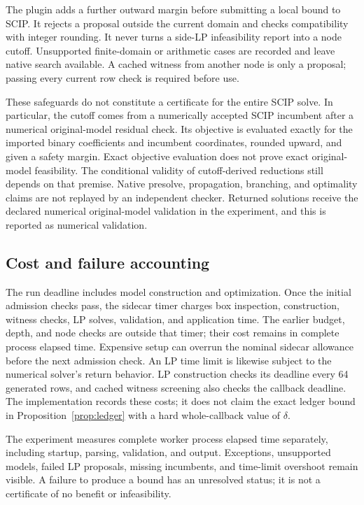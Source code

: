 The plugin adds a further outward margin before submitting a local bound
to SCIP. It rejects a proposal outside the current domain and checks
compatibility with integer rounding. It never turns a side-LP
infeasibility report into a node cutoff. Unsupported finite-domain or
arithmetic cases are recorded and leave native search available. A
cached witness from another node is only a proposal; passing every
current row check is required before use.

These safeguards do not constitute a certificate for the entire SCIP
solve. In particular, the cutoff comes from a numerically accepted SCIP
incumbent after a numerical original-model residual check. Its objective
is evaluated exactly for the imported binary coefficients and incumbent
coordinates, rounded upward, and given a safety margin. Exact objective
evaluation does not prove exact original-model feasibility. The
conditional validity of cutoff-derived reductions still
depends on that premise. Native presolve, propagation, branching, and
optimality claims are not replayed by an independent checker. Returned
solutions receive the declared numerical original-model validation in
the experiment, and this is reported as numerical validation.

\subsection{Cost and failure accounting}

The run deadline includes model construction and optimization. Once the
initial admission checks pass, the sidecar timer charges box inspection,
construction, witness checks, LP solves, validation, and application time.
The earlier budget, depth, and node checks are outside that timer;
their cost remains in complete process elapsed time. Expensive setup can overrun
the nominal sidecar allowance before the next admission check. An LP
time limit is likewise subject to the numerical solver's return behavior.
LP construction checks its deadline every 64 generated rows, and cached
witness screening also checks the callback deadline.
The implementation records these costs; it does not claim the exact
ledger bound in Proposition~\ref{prop:ledger} with a hard whole-callback
value of $\delta$.

The experiment measures complete worker process elapsed time separately,
including startup, parsing, validation, and output. Exceptions, unsupported
models, failed LP proposals, missing incumbents, and time-limit overshoot
remain visible. A failure to produce a bound has an unresolved status;
it is not a certificate of no benefit or infeasibility.
